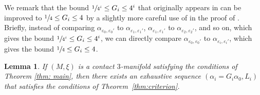 \documentclass[JEP,XML,SOM,Unicode,NoFloatCountersInSection]{cedram}
\theoremstyle{plain}
\newtheorem{lemma}[thm]{Lemma}
\theoremstyle{definition}
\numberwithin{equation}{subsection}
\begin{document}
We remark that the bound $\sfrac{1}{4^i}\leq G_i\leq 4^i$ that originally appears in \cite[Prop.\,10.2]{CH2} can be improved to $\sfrac{1}{4} \leq G_i \leq 4$ by a slightly more careful use of \cite[Lem.\,10.4\,\&\,10.5]{CH2} in the proof of \cite[Prop.\,10.2]{CH2}. Briefly, instead of comparing $\alpha_{\varepsilon_0,\varepsilon_0'}$ to $\alpha_{\varepsilon_1,\varepsilon_1'}$, $\alpha_{\varepsilon_1,\varepsilon_1'}$ to $\alpha_{\varepsilon_2,\varepsilon_2'}$, and so on, which gives the bound $\sfrac{1}{4^i}\leq G_i\leq 4^i$, we can directly compare $\alpha_{\varepsilon_0,\varepsilon_0'}$ to $\alpha_{\varepsilon_i,\varepsilon_i'}$, which gives the bound $\sfrac{1}{4}\leq G_i\leq 4$.

\begin{lemma}\label{lemma: criterion satisfied}
If $(M,\xi)$ is a contact $3$-manifold satisfying the conditions of Theorem \ref{thm: main}, then there exists an exhaustive sequence $(\alpha_i=G_i\alpha_0,L_i)$ that satisfies the conditions of Theorem~\ref{thm:criterion}.
\end{lemma}
\end{document}
